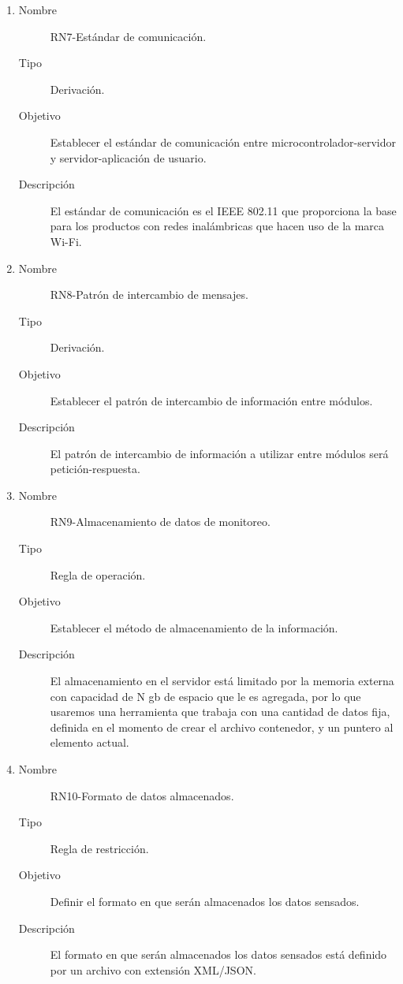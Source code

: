 \begin{enumerate}[label=RN\arabic*.]
\item \label{RN7}
		\begin{description}
			\item[Nombre] RN7-Estándar de comunicación.
			\item[Tipo] Derivación.
			\item[Objetivo] Establecer el estándar de comunicación entre microcontrolador-servidor y servidor-aplicación de usuario.
			\item[Descripción] El estándar de comunicación es el IEEE 802.11 que proporciona la base para los productos con redes inalámbricas que hacen uso de la marca Wi-Fi.
		\end{description}
		
\item \label{RN8}
		\begin{description}
			\item[Nombre] RN8-Patrón de intercambio de mensajes.
			\item[Tipo] Derivación.
			\item[Objetivo] Establecer el patrón de intercambio de información entre módulos.
			\item[Descripción] El patrón de intercambio de información a utilizar entre módulos será petición-respuesta.
		\end{description}
		
\item \label{RN9}
		\begin{description}
			\item[Nombre] RN9-Almacenamiento de datos de monitoreo.
			\item[Tipo] Regla de operación.
			\item[Objetivo] Establecer el método de almacenamiento de la información.
			\item[Descripción] El almacenamiento en el servidor está limitado por la memoria externa con capacidad de N gb de espacio que le es agregada, por lo que usaremos una herramienta que trabaja con una cantidad de datos fija, definida en el momento de crear el archivo contenedor, y un puntero al elemento actual.
		\end{description}


\item \label{RN10}
		\begin{description}
			\item[Nombre] RN10-Formato de datos almacenados.
			\item[Tipo] Regla de restricción.
			\item[Objetivo] Definir el formato en que serán almacenados los datos sensados.
			\item[Descripción] El formato en que serán almacenados los datos sensados está definido por un archivo con extensión XML/JSON. 
		\end{description}
		

\end{enumerate}
